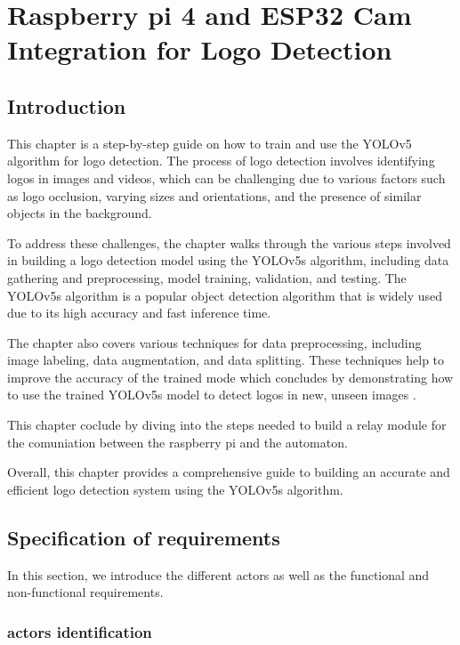 %



%



\chapter{Raspberry pi 4 and ESP32 Cam Integration for Logo Detection}
\section{Introduction}
This chapter is a step-by-step guide on how to train and use the YOLOv5 algorithm for logo detection. The process of logo detection involves identifying logos in images and videos, which can be challenging due to various factors such as logo occlusion, varying sizes and orientations, and the presence of similar objects in the background.

To address these challenges, the chapter walks through the various steps involved in building a logo detection model using the YOLOv5s algorithm, including data gathering and preprocessing, model training, validation, and testing. The YOLOv5s algorithm is a popular object detection algorithm that is widely used due to its high accuracy and fast inference time.

The chapter also covers various techniques for data preprocessing, including image labeling, data augmentation, and data splitting. These techniques help to improve the accuracy of the trained mode which concludes by demonstrating how to use the trained YOLOv5s model to detect logos in new, unseen images .

This chapter coclude by diving into the steps needed to build a relay  module for the comuniation between the raspberry pi and the automaton.

 Overall, this chapter provides a comprehensive guide to building an accurate and efficient logo detection system using the YOLOv5s algorithm.
\section{Specification of requirements}
In this section, we introduce the different actors as well as the functional and non-functional requirements.
\subsection{actors identification }
